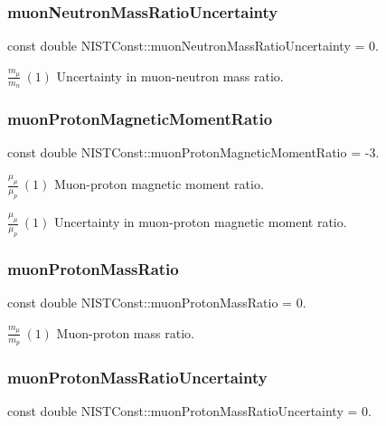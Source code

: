 \subsubsection{\texorpdfstring{muon\+Neutron\+Mass\+Ratio\+Uncertainty}{muonNeutronMassRatioUncertainty}}
{\footnotesize\ttfamily const double N\+I\+S\+T\+Const\+::muon\+Neutron\+Mass\+Ratio\+Uncertainty = 0.}

$\frac{m_\mu}{m_n} \ (1)$ Uncertainty in muon-\/neutron mass ratio. \mbox{\label{group___muon_gae49d53271e3ee71dc74d718028782d06}} 
\subsubsection{\texorpdfstring{muon\+Proton\+Magnetic\+Moment\+Ratio}{muonProtonMagneticMomentRatio}}
{\footnotesize\ttfamily const double N\+I\+S\+T\+Const\+::muon\+Proton\+Magnetic\+Moment\+Ratio = -\/3.}

$\frac{\mu_\mu}{\mu_p} \ (1)$ Muon-\/proton magnetic moment ratio.

$\frac{\mu_\mu}{\mu_p} \ (1)$ Uncertainty in muon-\/proton magnetic moment ratio. \mbox{\label{group___muon_ga72ca5408215ae40bb36ef1bff9107cf7}} 
\subsubsection{\texorpdfstring{muon\+Proton\+Mass\+Ratio}{muonProtonMassRatio}}
{\footnotesize\ttfamily const double N\+I\+S\+T\+Const\+::muon\+Proton\+Mass\+Ratio = 0.}

$\frac{m_\mu}{m_p} \ (1)$ Muon-\/proton mass ratio. \mbox{\label{group___muon_ga61cddfc40a08640b83041efd9d4dbbe2}} 
\subsubsection{\texorpdfstring{muon\+Proton\+Mass\+Ratio\+Uncertainty}{muonProtonMassRatioUncertainty}}
{\footnotesize\ttfamily const double N\+I\+S\+T\+Const\+::muon\+Proton\+Mass\+Ratio\+Uncertainty = 0.}

